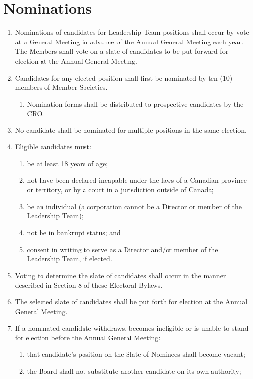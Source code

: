 \section{Nominations}
\label{nominations}

\begin{enumerate}
 \item Nominations of candidates for Leadership Team positions shall occur by vote at a General Meeting in advance of the Annual General Meeting each year. The Members shall vote on a slate of candidates to be put forward for election at the Annual General Meeting.
 \item Candidates for any elected position shall first be nominated by ten (10) members of Member Societies.
  \begin{enumerate}
   \item Nomination forms shall be distributed to prospective candidates by the CRO.
  \end{enumerate}
 \item No candidate shall be nominated for multiple positions in the same election.
 \item Eligible candidates must:
  \begin{enumerate}
   \item be at least 18 years of age;
   \item not have been declared incapable under the laws of a Canadian province or territory, or by a court in a jurisdiction outside of Canada;
   \item be an individual (a corporation cannot be a Director or member of the Leadership Team);
   \item not be in bankrupt status; and
   \item consent in writing to serve as a Director and/or member of the Leadership Team, if elected.
  \end{enumerate}
 \item Voting to determine the slate of candidates shall occur in the manner described in Section 8 of these Electoral Bylaws.
 \item The selected slate of candidates shall be put forth for election at the Annual General Meeting.
 \item If a nominated candidate withdraws, becomes ineligible or is unable to stand for election before the Annual General Meeting:
  \begin{enumerate}
   \item that candidate’s position on the Slate of Nominees shall become vacant;
   \item the Board shall not substitute another candidate on its own authority;

\end{enumerate}
\end{enumerate}
